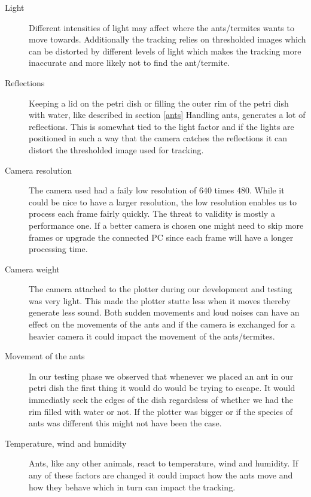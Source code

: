 \begin{description}
\item[Light] Different intensities of light may affect where the ants/termites wants to move towards. Additionally the tracking relies on thresholded images which can be distorted by different levels of light which makes the tracking more inaccurate and more likely not to find the ant/termite. \\

\item[Reflections] Keeping a lid on the petri dish or filling the outer rim of the petri dish with water, like described in section \ref{ants} Handling ants, generates a lot of reflections. This is somewhat tied to the light factor and if the lights are positioned in such a way that the camera catches the reflections it can distort the thresholded image used for tracking. \\

\item[Camera resolution] The camera used had a faily low resolution of 640 times 480. While it could be nice to have a larger resolution, the low resolution enables us to process each frame fairly quickly. The threat to validity is mostly a performance one. If a better camera is chosen one might need to skip more frames or upgrade the connected PC since each frame will have a longer processing time. \\

\item[Camera weight] The camera attached to the plotter during our development and testing was very light. This made the plotter stutte less when it moves thereby generate less sound. Both sudden movements and loud noises can have an effect on the movements of the ants and if the camera is exchanged for a heavier camera it could impact the movement of the ants/termites. \\

\item[Movement of the ants] In our testing phase we observed that whenever we placed an ant in our petri dish the first thing it would do would be trying to escape. It would immediatly seek the edges of the dish regardsless of whether we had the rim filled with water or not. If the plotter was bigger or if the species of ants was different this might not have been the case. \\

\item[Temperature, wind and humidity] Ants, like any other animals, react to temperature, wind and humidity. If any of these factors are changed it could impact how the ants move and how they behave which in turn can impact the tracking. \\  


\end{description}

